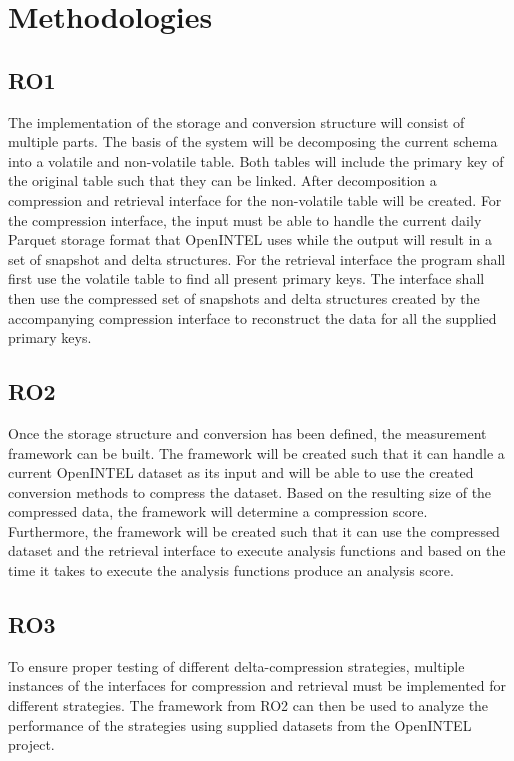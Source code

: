\section{Methodologies}

\subsection{RO1}

The implementation of the storage and conversion structure will consist of multiple parts.
The basis of the system will be decomposing the current schema into a volatile and non-volatile 
table. Both tables will include the primary key of the original table such that they can be linked.
After decomposition a compression and retrieval interface for the non-volatile table 
will be created. For the compression interface, the input must be able to handle the current 
daily Parquet storage format that OpenINTEL uses while the output will result in a set of 
snapshot and delta structures. For the retrieval interface the program shall first use the 
volatile table to find all present primary keys. The interface shall then use the compressed set 
of snapshots and delta structures created by the accompanying compression interface to reconstruct 
the data for all the supplied primary keys.

\subsection{RO2}

Once the storage structure and conversion has been defined, the measurement framework can be 
built. The framework will be created such that it can handle a current OpenINTEL dataset as 
its input and will be able to use the created conversion methods to compress the dataset. 
Based on the resulting size of the compressed data, the framework will determine a compression 
score. Furthermore, the framework will be created such that it can use the compressed dataset 
and the retrieval interface to execute analysis functions and based on the time it takes to 
execute the analysis functions produce an analysis score.

\subsection{RO3}

To ensure proper testing of different delta-compression strategies, multiple instances 
of the interfaces for compression and retrieval must be implemented for different strategies. 
The framework from RO2 can then be used to analyze the performance of the strategies 
using supplied datasets from the OpenINTEL project.


